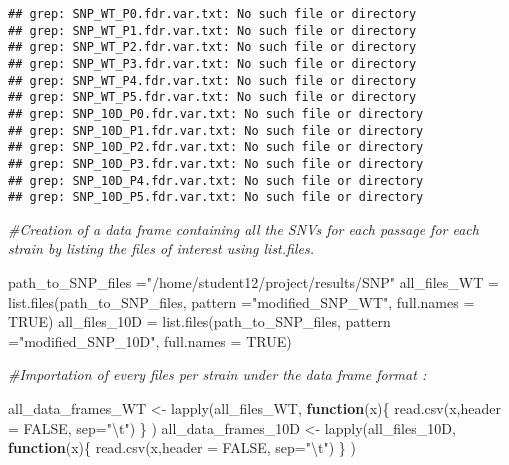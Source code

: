 \documentclass[
]{article}
\newenvironment{Shaded}{\begin{snugshade}}{\end{snugshade}}
\newcommand{\AttributeTok}[1]{\textcolor[rgb]{0.77,0.63,0.00}{#1}}
\newcommand{\CommentTok}[1]{\textcolor[rgb]{0.56,0.35,0.01}{\textit{#1}}}
\newcommand{\ConstantTok}[1]{\textcolor[rgb]{0.00,0.00,0.00}{#1}}
\newcommand{\ControlFlowTok}[1]{\textcolor[rgb]{0.13,0.29,0.53}{\textbf{#1}}}
\newcommand{\FunctionTok}[1]{\textcolor[rgb]{0.00,0.00,0.00}{#1}}
\newcommand{\NormalTok}[1]{#1}
\newcommand{\OtherTok}[1]{\textcolor[rgb]{0.56,0.35,0.01}{#1}}
\newcommand{\SpecialCharTok}[1]{\textcolor[rgb]{0.00,0.00,0.00}{#1}}
\newcommand{\StringTok}[1]{\textcolor[rgb]{0.31,0.60,0.02}{#1}}
\begin{document}
\begin{verbatim}
## grep: SNP_WT_P0.fdr.var.txt: No such file or directory
## grep: SNP_WT_P1.fdr.var.txt: No such file or directory
## grep: SNP_WT_P2.fdr.var.txt: No such file or directory
## grep: SNP_WT_P3.fdr.var.txt: No such file or directory
## grep: SNP_WT_P4.fdr.var.txt: No such file or directory
## grep: SNP_WT_P5.fdr.var.txt: No such file or directory
## grep: SNP_10D_P0.fdr.var.txt: No such file or directory
## grep: SNP_10D_P1.fdr.var.txt: No such file or directory
## grep: SNP_10D_P2.fdr.var.txt: No such file or directory
## grep: SNP_10D_P3.fdr.var.txt: No such file or directory
## grep: SNP_10D_P4.fdr.var.txt: No such file or directory
## grep: SNP_10D_P5.fdr.var.txt: No such file or directory
\end{verbatim}

\begin{Shaded}
\begin{Highlighting}[]
\CommentTok{\#Creation of a data frame containing all the SNVs for each passage for each strain by listing the files of interest using list.files.}

\NormalTok{path\_to\_SNP\_files }\OtherTok{=}\StringTok{"/home/student12/project/results/SNP"}
\NormalTok{all\_files\_WT }\OtherTok{=} \FunctionTok{list.files}\NormalTok{(path\_to\_SNP\_files, }\AttributeTok{pattern =}\StringTok{"modified\_SNP\_WT"}\NormalTok{, }\AttributeTok{full.names =} \ConstantTok{TRUE}\NormalTok{)}
\NormalTok{all\_files\_10D }\OtherTok{=} \FunctionTok{list.files}\NormalTok{(path\_to\_SNP\_files, }\AttributeTok{pattern =}\StringTok{"modified\_SNP\_10D"}\NormalTok{, }\AttributeTok{full.names =} \ConstantTok{TRUE}\NormalTok{)}

\CommentTok{\#Importation of every files per strain under the data frame format :}

\NormalTok{all\_data\_frames\_WT }\OtherTok{\textless{}{-}} \FunctionTok{lapply}\NormalTok{(all\_files\_WT, }\ControlFlowTok{function}\NormalTok{(x)\{}
  \FunctionTok{read.csv}\NormalTok{(x,}\AttributeTok{header =} \ConstantTok{FALSE}\NormalTok{, }\AttributeTok{sep=}\StringTok{"}\SpecialCharTok{\textbackslash{}t}\StringTok{"}\NormalTok{) \} )}
\NormalTok{all\_data\_frames\_10D }\OtherTok{\textless{}{-}} \FunctionTok{lapply}\NormalTok{(all\_files\_10D, }\ControlFlowTok{function}\NormalTok{(x)\{}
  \FunctionTok{read.csv}\NormalTok{(x,}\AttributeTok{header =} \ConstantTok{FALSE}\NormalTok{, }\AttributeTok{sep=}\StringTok{"}\SpecialCharTok{\textbackslash{}t}\StringTok{"}\NormalTok{) \} )}


\end{Highlighting}
\end{Shaded}
\end{document}
